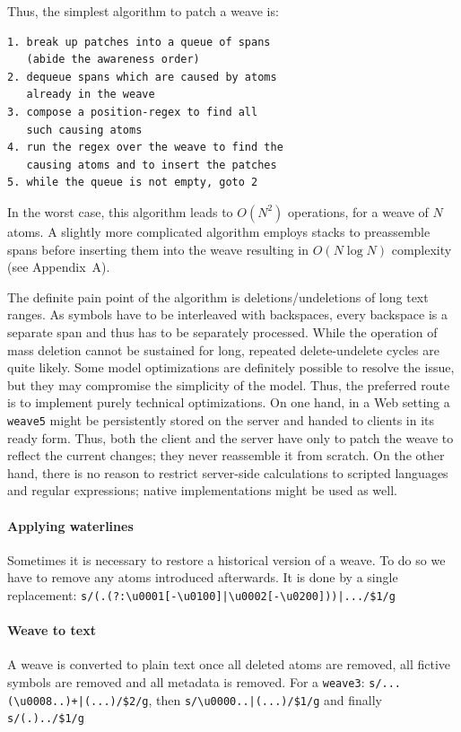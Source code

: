 \documentclass{acm_proc_article-sp}
\begin{document}
Thus, the  simplest algorithm to patch a weave is:
\begin{verbatim}
1. break up patches into a queue of spans
   (abide the awareness order)
2. dequeue spans which are caused by atoms
   already in the weave
3. compose a position-regex to find all
   such causing atoms
4. run the regex over the weave to find the
   causing atoms and to insert the patches
5. while the queue is not empty, goto 2
\end{verbatim}
In the worst case, this algorithm leads to $O(N^{2})$ operations, for a weave of $N$ atoms.
A slightly more complicated algorithm employs stacks to preassemble spans before inserting them into the weave resulting in $O(N\log N)$ complexity (see Appendix~A).

The definite pain point of the algorithm is deletions/undeletions of long text ranges. As symbols have to be interleaved with backspaces, every backspace is a separate span and thus has to be separately processed. While the operation of mass deletion cannot be sustained for long, repeated delete-undelete cycles are quite likely. Some model optimizations are definitely possible to resolve the issue, but they may compromise the simplicity of the model. Thus, the preferred route is to implement purely technical optimizations. On one hand, in a Web setting a {\tt weave5} might be persistently stored on the server and handed to clients in its ready form. Thus, both the client and the server have only to patch the weave to reflect the current changes; they never reassemble it from scratch. On the other hand, there is no reason to restrict server-side calculations to scripted languages and regular expressions; native implementations might be used as well.


\paragraph{Applying waterlines}
Sometimes it is necessary to restore a historical version of a weave. To do so we have to remove any atoms introduced afterwards. It is done by a single replacement:
\verb+s/(.(?:\u0001[-\u0100]|\u0002[-\u0200]))|.../$1/g+

\paragraph{Weave to text}

A weave is converted to plain text once all deleted atoms are removed, all fictive symbols are removed and all metadata is removed. For a {\tt weave3}: \verb!s/...(\u0008..)+|(...)/$2/g!, then \verb+s/\u0000..|(...)/$1/g+ and finally \verb+s/(.)../$1/g+
\end{document}
